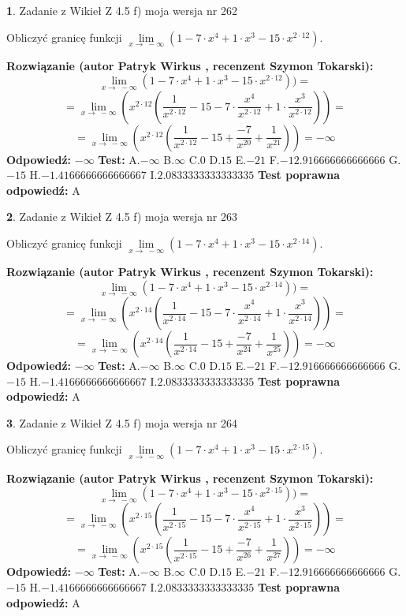 \documentclass[12pt, a4paper]{article}
\theoremstyle{definition} %
\newtheorem{zad}{}
\newcommand{\zadStart}[1]{\begin{zad}#1\newline}
\newcommand{\zadStop}{\end{zad}}
\newcommand{\rozwStart}[2]{\noindent \textbf{Rozwiązanie (autor #1 , recenzent #2): }\newline}
\newcommand{\rozwStop}{\newline}
\newcommand{\odpStart}{\noindent \textbf{Odpowiedź:}\newline}
\newcommand{\odpStop}{\newline}
\newcommand{\testStart}{\noindent \textbf{Test:}\newline}
\newcommand{\testStop}{\newline}
\newcommand{\kluczStart}{\noindent \textbf{Test poprawna odpowiedź:}\newline}
\newcommand{\kluczStop}{\newline}
\begin{document}
\zadStart{Zadanie z Wikieł Z 4.5 f) moja wersja nr 262}


Obliczyć granicę funkcji  $\lim\limits_{x\to\ -\infty}(1 - 7 \cdot x^{4}+1 \cdot x^{3}- 15 \cdot x^{2\cdot12})$.
\zadStop
\rozwStart{Patryk Wirkus}{Szymon Tokarski}
$$\lim\limits_{x\to\ -\infty}(1 - 7 \cdot x^{4}+1 \cdot x^{3}- 15 \cdot x^{2\cdot12}))=$$
$$=\lim\limits_{x\to\ -\infty}(x^{2\cdot12}(\frac{1}{x^{2\cdot12}}-15 -7 \cdot \frac{x^{4}}{x^{2\cdot12}}+1 \cdot \frac{x^{3}}{x^{2\cdot12}}))=$$
$$=\lim\limits_{x\to\ -\infty}(x^{2\cdot12}(\frac{1}{x^{2\cdot12}}-15 + \frac{-7}{x^{20}}+ \frac{1}{x^{21}}))=-\infty$$
\rozwStop
\odpStart
$-\infty$
\odpStop
\testStart
A.$-\infty$ B.$\infty$ C.$0$ D.$15$ E.$-21$
F.$-12.916666666666666$ G.$-15$
H.$-1.4166666666666667$
I.$2.0833333333333335$
\testStop
\kluczStart
A
\kluczStop



\zadStart{Zadanie z Wikieł Z 4.5 f) moja wersja nr 263}


Obliczyć granicę funkcji  $\lim\limits_{x\to\ -\infty}(1 - 7 \cdot x^{4}+1 \cdot x^{3}- 15 \cdot x^{2\cdot14})$.
\zadStop
\rozwStart{Patryk Wirkus}{Szymon Tokarski}
$$\lim\limits_{x\to\ -\infty}(1 - 7 \cdot x^{4}+1 \cdot x^{3}- 15 \cdot x^{2\cdot14}))=$$
$$=\lim\limits_{x\to\ -\infty}(x^{2\cdot14}(\frac{1}{x^{2\cdot14}}-15 -7 \cdot \frac{x^{4}}{x^{2\cdot14}}+1 \cdot \frac{x^{3}}{x^{2\cdot14}}))=$$
$$=\lim\limits_{x\to\ -\infty}(x^{2\cdot14}(\frac{1}{x^{2\cdot14}}-15 + \frac{-7}{x^{24}}+ \frac{1}{x^{25}}))=-\infty$$
\rozwStop
\odpStart
$-\infty$
\odpStop
\testStart
A.$-\infty$ B.$\infty$ C.$0$ D.$15$ E.$-21$
F.$-12.916666666666666$ G.$-15$
H.$-1.4166666666666667$
I.$2.0833333333333335$
\testStop
\kluczStart
A
\kluczStop



\zadStart{Zadanie z Wikieł Z 4.5 f) moja wersja nr 264}


Obliczyć granicę funkcji  $\lim\limits_{x\to\ -\infty}(1 - 7 \cdot x^{4}+1 \cdot x^{3}- 15 \cdot x^{2\cdot15})$.
\zadStop
\rozwStart{Patryk Wirkus}{Szymon Tokarski}
$$\lim\limits_{x\to\ -\infty}(1 - 7 \cdot x^{4}+1 \cdot x^{3}- 15 \cdot x^{2\cdot15}))=$$
$$=\lim\limits_{x\to\ -\infty}(x^{2\cdot15}(\frac{1}{x^{2\cdot15}}-15 -7 \cdot \frac{x^{4}}{x^{2\cdot15}}+1 \cdot \frac{x^{3}}{x^{2\cdot15}}))=$$
$$=\lim\limits_{x\to\ -\infty}(x^{2\cdot15}(\frac{1}{x^{2\cdot15}}-15 + \frac{-7}{x^{26}}+ \frac{1}{x^{27}}))=-\infty$$
\rozwStop
\odpStart
$-\infty$
\odpStop
\testStart
A.$-\infty$ B.$\infty$ C.$0$ D.$15$ E.$-21$
F.$-12.916666666666666$ G.$-15$
H.$-1.4166666666666667$
I.$2.0833333333333335$
\testStop
\kluczStart
A
\kluczStop
\end{document}
